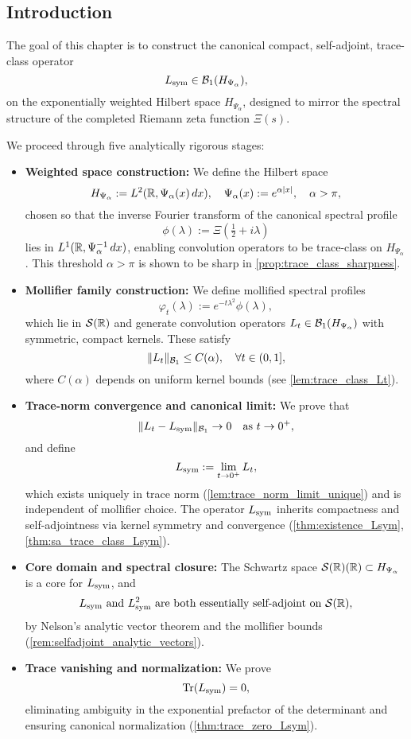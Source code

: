 \subsection*{Introduction}

The goal of this chapter is to construct the canonical compact, self-adjoint, trace-class operator
\[
L_{\mathrm{sym}} \in \mathcal{B}_1(H_{\Psi_\alpha}),
\]
on the exponentially weighted Hilbert space \( H_{\Psi_\alpha} \), designed to mirror the spectral structure of the completed Riemann zeta function \( \Xi(s) \).

We proceed through five analytically rigorous stages:

\begin{itemize}
    \item \textbf{Weighted space construction:} We define the Hilbert space
    \[
    H_{\Psi_\alpha} := L^2(\mathbb{R}, \Psi_\alpha(x)\, dx), \quad \Psi_\alpha(x) := e^{\alpha |x|}, \quad \alpha > \pi,
    \]
    chosen so that the inverse Fourier transform of the canonical spectral profile
    \[
    \phi(\lambda) := \Xi\left(\tfrac{1}{2} + i\lambda\right)
    \]
    lies in \( L^1(\mathbb{R}, \Psi_\alpha^{-1}\, dx) \), enabling convolution operators to be trace-class on \( H_{\Psi_\alpha} \). This threshold \( \alpha > \pi \) is shown to be sharp in \cref{prop:trace_class_sharpness}.

    \item \textbf{Mollifier family construction:} We define mollified spectral profiles
    \[
    \varphi_t(\lambda) := e^{-t\lambda^2} \phi(\lambda),
    \]
    which lie in \( \mathcal{S}(\mathbb{R}) \) and generate convolution operators \( L_t \in \mathcal{B}_1(H_{\Psi_\alpha}) \) with symmetric, compact kernels. These satisfy
    \[
    \| L_t \|_{\mathcal{B}_1} \le C(\alpha), \quad \forall t \in (0,1],
    \]
    where \( C(\alpha) \) depends on uniform kernel bounds (see \cref{lem:trace_class_Lt}).

    \item \textbf{Trace-norm convergence and canonical limit:} We prove that
    \[
    \| L_t - L_{\mathrm{sym}} \|_{\mathcal{B}_1} \to 0 \quad \text{as } t \to 0^+,
    \]
    and define
    \[
    L_{\mathrm{sym}} := \lim_{t \to 0^+} L_t,
    \]
    which exists uniquely in trace norm (\cref{lem:trace_norm_limit_unique}) and is independent of mollifier choice. The operator \( L_{\mathrm{sym}} \) inherits compactness and self-adjointness via kernel symmetry and convergence (\cref{thm:existence_Lsym}, \cref{thm:sa_trace_class_Lsym}).

    \item \textbf{Core domain and spectral closure:} The Schwartz space \( \mathcal{S}(\mathbb{R})(\mathbb{R}) \subset H_{\Psi_\alpha} \) is a core for \( L_{\mathrm{sym}} \), and
    \[
    L_{\mathrm{sym}} \text{ and } L_{\mathrm{sym}}^2 \text{ are both essentially self-adjoint on } \mathcal{S}(\mathbb{R}),
    \]
    by Nelson’s analytic vector theorem and the mollifier bounds (\cref{rem:selfadjoint_analytic_vectors}).

    \item \textbf{Trace vanishing and normalization:} We prove
    \[
    \operatorname{Tr}(L_{\mathrm{sym}}) = 0,
    \]
    eliminating ambiguity in the exponential prefactor of the determinant and ensuring canonical normalization (\cref{thm:trace_zero_Lsym}).
\end{itemize}

